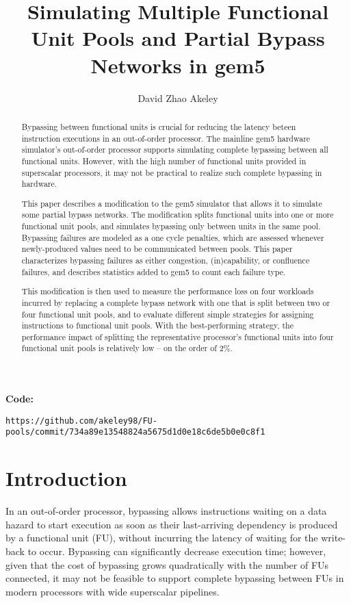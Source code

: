 \documentclass[11pt]{article}
\title{Simulating Multiple Functional Unit Pools and Partial Bypass
  Networks in gem5}
\author{David Zhao Akeley}
\begin{document}
\maketitle
\begin{abstract}
Bypassing between functional units is crucial for reducing the latency
beteen instruction executions in an out-of-order processor. The
mainline gem5 hardware simulator's out-of-order processor supports
simulating complete bypassing between all functional units. However,
with the high number of functional units provided in superscalar
processors, it may not be practical to realize such complete bypassing
in hardware.

This paper describes a modification to the gem5 simulator that allows
it to simulate some partial bypass networks. The modification splits
functional units into one or more functional unit pools, and simulates
bypassing only between units in the same pool. Bypassing failures are
modeled as a one cycle penalties, which are assessed whenever
newly-produced values need to be communicated between pools. This
paper characterizes bypassing failures as either congestion,
(in)capability, or confluence failures, and describes statistics added
to gem5 to count each failure type.

This modification is then used to measure the performance loss on four
workloads incurred by replacing a complete bypass network with one
that is split between two or four functional unit pools, and to
evaluate different simple strategies for assigning instructions to
functional unit pools. With the best-performing strategy, the
performance impact of splitting the representative processor's
functional units into four functional unit pools is relatively low --
on the order of 2\%.

\end{abstract}

\textbf{Code:}

\texttt{https://github.com/akeley98/FU-pools/commit/734a89e13548824a5675d1d0e18c6de5b0e0c8f1}
\newpage
\section{Introduction}

In an out-of-order processor, bypassing allows instructions waiting on
a data hazard to start execution as soon as their last-arriving
dependency is produced by a functional unit (FU), without incurring
the latency of waiting for the write-back to occur. Bypassing can
significantly decrease execution time; however, given that the cost of
bypassing grows quadratically with the number of FUs connected, it may
not be feasible to support complete bypassing between FUs in modern
processors with wide superscalar pipelines.
\end{document}

